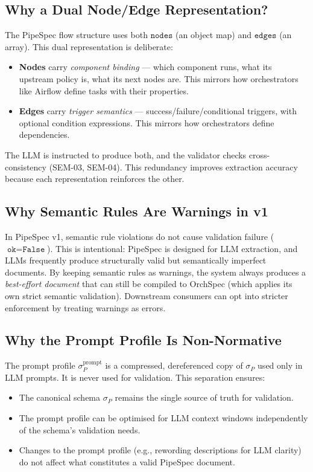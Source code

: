 \documentclass[11pt,a4paper]{article}
\theoremstyle{definition}
\begin{document}
\subsection{Why a Dual Node/Edge Representation?}
The PipeSpec flow structure uses both $\texttt{nodes}$ (an object map) and $\texttt{edges}$ (an array). This dual representation is deliberate:
\begin{itemize}[leftmargin=*]
    \item \textbf{Nodes} carry \emph{component binding} — which component runs, what its upstream policy is, what its next nodes are. This mirrors how orchestrators like Airflow define tasks with their properties.
    \item \textbf{Edges} carry \emph{trigger semantics} — success/failure/conditional triggers, with optional condition expressions. This mirrors how orchestrators define dependencies.
\end{itemize}
The LLM is instructed to produce both, and the validator checks cross-consistency (SEM-03, SEM-04). This redundancy improves extraction accuracy because each representation reinforces the other.

\subsection{Why Semantic Rules Are Warnings in v1}
In PipeSpec v1, semantic rule violations do not cause validation failure ($\texttt{ok} = \texttt{False}$). This is intentional: PipeSpec is designed for LLM extraction, and LLMs frequently produce structurally valid but semantically imperfect documents. By keeping semantic rules as warnings, the system always produces a \emph{best-effort document} that can still be compiled to OrchSpec (which applies its own strict semantic validation). Downstream consumers can opt into stricter enforcement by treating warnings as errors.

\subsection{Why the Prompt Profile Is Non-Normative}
The prompt profile $\sigma_P^{\text{prompt}}$ is a compressed, dereferenced copy of $\sigma_P$ used only in LLM prompts. It is never used for validation. This separation ensures:
\begin{itemize}[leftmargin=*]
    \item The canonical schema $\sigma_P$ remains the single source of truth for validation.
    \item The prompt profile can be optimised for LLM context windows independently of the schema's validation needs.
    \item Changes to the prompt profile (e.g., rewording descriptions for LLM clarity) do not affect what constitutes a valid PipeSpec document.
\end{itemize}
\end{document}
